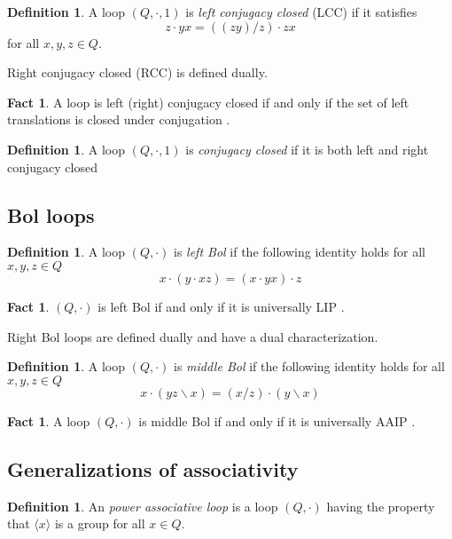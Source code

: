 \documentclass[12pt, twoside, openright]{report}
\theoremstyle{definition}
\newtheorem{fct}[thm]{Fact}
\newtheorem{dfn}[thm]{Definition}
\newcommand{\ldv}{\backslash}       %
\newcommand{\rdv}{/}                %
\begin{document}
\begin{dfn}
  A loop $(Q, \cdot, 1)$ is \emph{left conjugacy closed} (LCC) if it satisfies
  \[z\cdot yx = ((zy)\rdv z)\cdot zx\]
  for all $x, y, z\in Q$.
\end{dfn}

Right conjugacy closed (RCC) is defined dually.

\begin{fct}
  A loop is left (right) conjugacy closed if and only if the set of left translations is closed under conjugation \cite{PACC}.
\end{fct}

\begin{dfn}
  A loop $(Q, \cdot, 1)$ is \emph{conjugacy closed} if it is both left and right conjugacy closed
\end{dfn}

\subsection{Bol loops}

\begin{dfn}
  A loop $(Q, \cdot)$ is \emph{left Bol} if the following identity holds for all $x, y, z\in Q$
  \[x\cdot (y\cdot xz) = (x\cdot yx)\cdot z\]
\end{dfn}

\begin{fct}
  $(Q, \cdot)$ is left Bol if and only if it is universally LIP \cite{SUF}.
\end{fct}

Right Bol loops are defined dually and have a dual characterization.

\begin{dfn}
  A loop $(Q, \cdot)$ is \emph{middle Bol} if the following identity holds for all $x, y, z\in Q$
  \[x\cdot (yz\ldv x) = (x\rdv z)\cdot (y\ldv x)\]
\end{dfn}

\begin{fct}
  A loop $(Q, \cdot)$ is middle Bol if and only if it is universally AAIP \cite{SUF}.
\end{fct}

\subsection{Generalizations of associativity}

\begin{dfn}
  An \emph{power associative loop} is a loop $(Q, \cdot)$ having the property that $\langle x\rangle$ is a group
    for all $x\in Q$.
\end{dfn}
\end{document}
